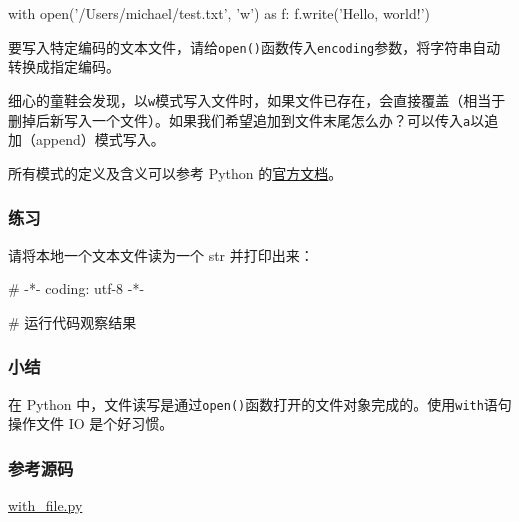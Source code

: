 \begin{pythoncode}
with open('/Users/michael/test.txt', 'w') as f:
    f.write('Hello, world!')
\end{pythoncode}

要写入特定编码的文本文件，请给\texttt{open()}函数传入\texttt{encoding}参数，将字符串自动转换成指定编码。

细心的童鞋会发现，以\texttt{\textquotesingle{}w\textquotesingle{}}模式写入文件时，如果文件已存在，会直接覆盖（相当于删掉后新写入一个文件）。如果我们希望追加到文件末尾怎么办？可以传入\texttt{\textquotesingle{}a\textquotesingle{}}以追加（append）模式写入。

所有模式的定义及含义可以参考 Python
的\href{https://docs.python.org/3/library/functions.html\#open}{官方文档}。

\hypertarget{ux7ec3ux4e60}{%
\subsubsection{练习}\label{ux7ec3ux4e60}}

请将本地一个文本文件读为一个 str 并打印出来：

\begin{pythoncode}
# -*- coding: utf-8 -*-
\end{pythoncode}

\begin{pythoncode}
# 运行代码观察结果
\end{pythoncode}

\hypertarget{ux5c0fux7ed3}{%
\subsubsection{小结}\label{ux5c0fux7ed3}}

在 Python
中，文件读写是通过\texttt{open()}函数打开的文件对象完成的。使用\texttt{with}语句操作文件
IO 是个好习惯。

\hypertarget{ux53c2ux8003ux6e90ux7801}{%
\subsubsection{参考源码}\label{ux53c2ux8003ux6e90ux7801}}

\href{https://github.com/michaelliao/learn-python3/tree/master/samples/io/with_file.py}{with\_file.py}

